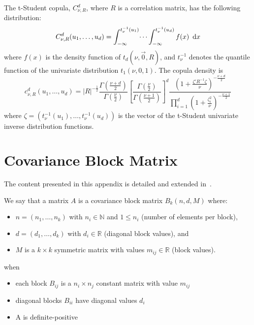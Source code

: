 \documentclass[11pt,fleqn]{book} %
\begin{document}
\begin{proposition}
	The t-Student copula, $C_{\nu,R}^d$, where $R$ is a correlation matrix,
	has the following distribution:
	\begin{displaymath}
		C_{\nu,R}^d(u_1, \dots, u_d) = 
		\int_{-\infty}^{t_\nu^{-1}(u_1)} \dots \int_{-\infty}^{t_\nu^{-1}(u_d)} f(x)\ \mathop{\mathrm{{}d}}\mathopen{} x
	\end{displaymath}
	where $f(x)$ is the density function of $t_d(\nu,\vec{0},R)$, and $t_{\nu}^{-1}$ 
	denotes the quantile function of the univariate distribution $t_1(\nu,0,1)$. 
	The copula density is
	\begin{displaymath}
		\label{eq:density}
		c_{\nu,R}^d(u_1,\dots,u_d) =
		|R|^{-\frac{1}{2}} 
		\displaystyle\frac{\Gamma{\left(\frac{\nu+d}{2}\right)}}{\Gamma{\left(\frac{\nu}{2}\right)}}
		\displaystyle\left[ \frac{\Gamma{\left(\frac{\nu}{2}\right)}}{\Gamma{\left(\frac{\nu+1}{2}\right)}} \right]^d
		\frac{\displaystyle\left( 1+\frac{\zeta' R^{-1} \zeta}{\nu}\right)^{-\frac{\nu+d}{2}}}{\displaystyle\prod_{i=1}^d \left( 1+\frac{\zeta_i^2}{\nu} \right)^{-\frac{\nu+1}{2}}}
	\end{displaymath}
	\noindent
	where $\zeta=(t_\nu^{-1}(u_1), \dots, t_\nu^{-1}(u_d))$ is the vector of 
	the t-Student univariate inverse distribution functions.
\end{proposition}

\section{Covariance Block Matrix}
\label{ap:cbm}

The content presented in this appendix is detailed and extended 
in~\cite{torrent:2012}.

\begin{definition}
	We say that a matrix $A$ is a covariance block matrix $B_k(n,d,M)$ where:
	\begin{itemize}
		\item $n=(n_1,\dots,n_k)$ with $n_i \in \mathbb{N}$ and $1 \le n_i$ (number of elements per block),
		\item $d=(d_1,\dots,d_k)$ with $d_i \in \mathbb{R}$ (diagonal block values), and
		\item $M$ is a $k {\times} k$ symmetric matrix with values $m_{ij} \in \mathbb{R}$ (block values).
	\end{itemize}
	when
	\begin{itemize}
		\item each block $B_{ij}$ is a $n_i {\times} n_j$ constant matrix with value $m_{ij}$
		\item diagonal blocks $B_{ii}$ have diagonal values $d_i$
		\item A is definite-positive
	\end{itemize}
\end{definition}
\end{document}
